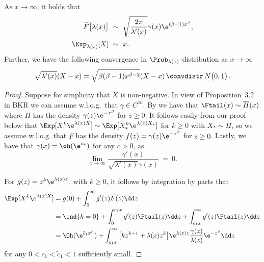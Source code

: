 \begin{proposition}\label{Prop:18.12a} As $x\to\infty$, it holds that
	\begin{align}\label{18.12a} \widehat  F\bigl[\lambda(x)\bigr]\ &\sim\ \sqrt{\frac{2\pi}{\lambda'(x)}}\gamma(x)\e^{(\beta-1)x^\beta},\\
	\label{18.12b}\Exp_{\lambda(x)}[X]\ &\sim\ x.
	\end{align}
	Further, we have the following convergence in $\Prob_{\lambda(x)}$-distribution as $x\to \infty$
	\begin{align} \label{18.13}
	\sqrt{\lambda'(x)}(X-x)=\sqrt{\beta(\beta-1) x^{\beta-2}}(X-x)\,\convdistr\,N\bigl(0,1\bigr) \,.
	\end{align}
\end{proposition}
\begin{proof}
	Suppose for simplicity that $X$ is non-negative.
	In view of Proposition~3.2 in BKR we can assume w.l.o.g.\ that $\gamma \in C^\infty$.
	By  we have that $\Ftail(x) \sim \overline{H}(x)$ where $H$ has the density $\gamma(z) \e^{-z^\beta}$ for $z \ge 0$.
	It follows easily from our proof below that $\Exp[X^k \e^{\lambda(x) X}] \sim \Exp[X^k_* \e^{\lambda(x) X_*}]$ for $k \ge 0$ with $X_* \sim H$, so we assume w.l.o.g. that $F$ has the density $f(z)= \gamma(z) \e^{-z^\beta}$ for $z \ge 0$.
	Lastly, we have that $\gamma(x)= \oh(\e^{cx})$ for any $c>0$, as
	\begin{equation} \label{2.12i}
	\lim_{x\to \infty}\frac{\gamma'(x)}{\sqrt{\lambda'(x)} \gamma(x)}\ =\ 0.
	\end{equation}

	For $g(z)= z^k \e^{\lambda(x) z}$, with $k\ge 0$, it follows by integration by parts that
	\begin{align}
		\Exp[X^k \e^{\lambda(x) X}] &= g(0) + \int_{0}^\infty g'(z) \overline{ F}(z) \dd z \notag \\
		&= \ind{k=0} + \int_{0} ^{c_1x} g'(z) \Ftail(z) \dd z + \int_{c_1x}^\infty g'(z) \Ftail(z) \dd z \notag \\
		&= \Oh(\e^{ \tilde c_1 x ^\beta}) + \int_{c_1x}^\infty \big[ k z^{k-1} + \lambda(x) z^k \big] \e^{\lambda(x)z} \frac{\gamma(z)}{\lambda(z)} \e^{-z^\beta} \dd z \label{int_by_parts}
	\end{align}
	for any $0< c_1< \tilde c_1< 1$ sufficiently small.


\end{proof}
